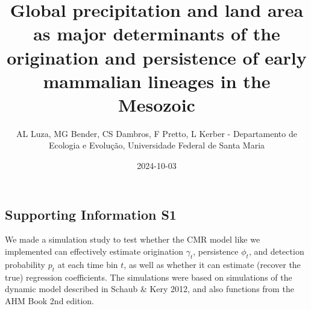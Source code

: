\documentclass[
]{article}
\title{Global precipitation and land area as major determinants of the
origination and persistence of early mammalian lineages in the Mesozoic}
\author{AL Luza, MG Bender, CS Dambros, F Pretto, L Kerber -
Departamento de Ecologia e Evolução, Universidade Federal de Santa
Maria}
\date{2024-10-03}
\begin{document}
\maketitle

\hypertarget{supporting-information-s1}{%
\subsection{Supporting Information S1}\label{supporting-information-s1}}

We made a simulation study to test whether the CMR model like we
implemented can effectively estimate origination \(\gamma_t\),
persistence \(\phi_t\), and detection probability \(p_t\) at each time
bin \(t\), as well as whether it can estimate (recover the true)
regression coefficients. The simulations were based on simulations of
the dynamic model described in Schaub \& Kery 2012, and also functions
from the AHM Book 2nd edition.
\end{document}
